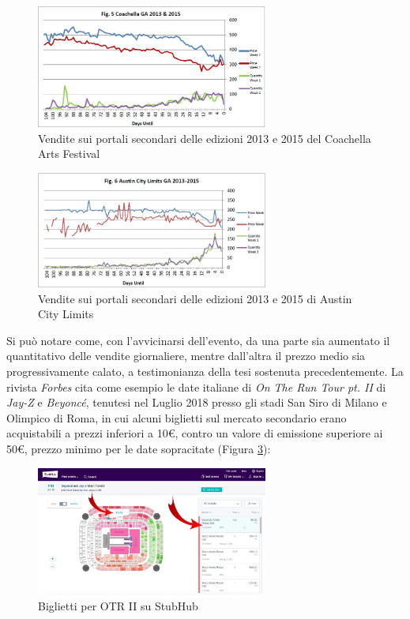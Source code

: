 \begin{figure}[htbp]
	\centering
	\includegraphics[width=0.68\textwidth]{chapter4/immagini/coachella1315}
	\caption{Vendite sui portali secondari delle edizioni 2013 e 2015 del Coachella Arts Festival}
	\label{coach}
\end{figure}
\begin{figure}[htbp]
	\centering
	\includegraphics[width=0.68\textwidth]{chapter4/immagini/acl1315}
	\caption{Vendite sui portali secondari delle edizioni 2013 e 2015 di Austin City Limits}
	\label{acl}
\end{figure}
Si può notare come, con l'avvicinarsi dell'evento, da una parte sia aumentato il quantitativo delle vendite giornaliere, mentre dall'altra il prezzo medio sia progressivamente calato, a testimonianza della tesi sostenuta precedentemente. 
La rivista \textit{Forbes} cita come esempio le date italiane di \textit{On The Run Tour pt. II} di \textit{Jay-Z} e \textit{Beyoncé}, tenutesi nel Luglio 2018 presso gli stadi San Siro di Milano e Olimpico di Roma, in cui alcuni biglietti sul mercato secondario erano acquistabili a prezzi inferiori a 10€, contro un valore di emissione superiore ai 50€, prezzo minimo per le date sopracitate (Figura \ref{jayz}):
\begin{figure}[H]
	\centering
	\includegraphics[width=0.68\textwidth]{chapter4/immagini/beyonce_jay_z}
	\caption{Biglietti per OTR II su StubHub}
	\label{jayz}
\end{figure}

